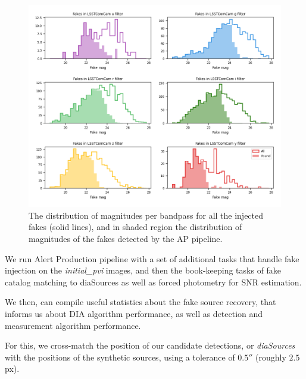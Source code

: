 \begin{figure}
    \centering
    \includegraphics[width=0.95\linewidth]{figures/simple_hist_completeness_mag_per_filter.png}
    \caption{The distribution of magnitudes per bandpass for all the injected fakes (solid lines), and in shaded region the distribution of magnitudes of the fakes detected by the AP pipeline.}
    \label{fig:found_fakes_per_Filter}
\end{figure}


We run Alert Production pipeline with a set of additional tasks that handle fake injection on the \textit{initial\_pvi} images, and then the book-keeping tasks of fake catalog matching to diaSources as well as forced photometry for SNR estimation.

We then, can compile useful statistics about the fake source recovery, that informs us about DIA algorithm performance, as well as detection and measurement algorithm performance. 

For this, we cross-match the position of our candidate detections, or \textit{diaSources} with the positions of the synthetic sources, using a tolerance of $0.5''$ (roughly $2.5$px). 


